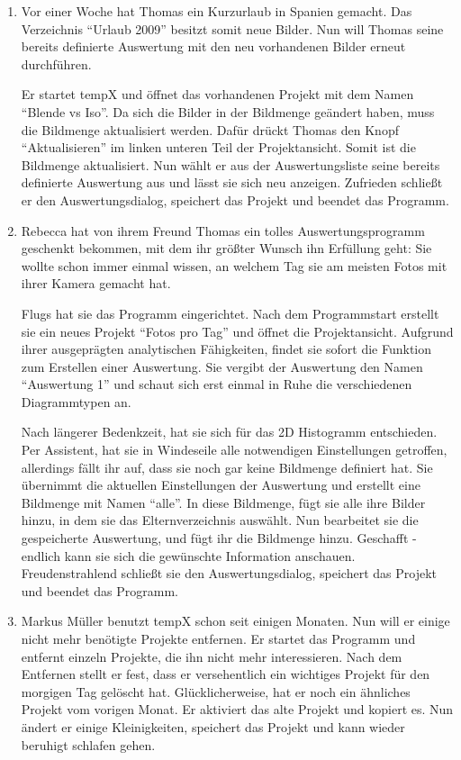 \begin{enumerate}
	\item Vor einer Woche hat Thomas ein Kurzurlaub in Spanien gemacht. Das Verzeichnis "`Urlaub 2009"' besitzt somit neue Bilder. Nun will Thomas seine bereits definierte Auswertung mit den neu vorhandenen Bilder erneut durchführen.\par
	Er startet \gls{tempX} und öffnet das vorhandenen Projekt mit dem Namen "`Blende vs Iso"'. Da sich die Bilder in der Bildmenge geändert haben, muss die Bildmenge aktualisiert werden. Dafür drückt Thomas den Knopf "`Aktualisieren"' im linken unteren Teil der Projektansicht.  Somit ist die Bildmenge aktualisiert. Nun wählt er aus der Auswertungsliste seine bereits definierte Auswertung aus und lässt sie sich neu anzeigen. Zufrieden schließt er den Auswertungsdialog, speichert das Projekt und beendet das Programm.

	\item Rebecca hat von ihrem Freund Thomas ein tolles Auswertungsprogramm geschenkt bekommen, mit dem ihr größter Wunsch ihn Erfüllung geht: Sie wollte schon immer einmal wissen, an welchem Tag sie am meisten Fotos mit ihrer Kamera gemacht hat.\par
	Flugs hat sie das Programm eingerichtet. Nach dem Programmstart erstellt sie ein neues Projekt "`Fotos pro Tag"' und öffnet die Projektansicht. Aufgrund ihrer ausgeprägten analytischen Fähigkeiten, findet sie sofort die Funktion zum Erstellen einer Auswertung. Sie vergibt der Auswertung den Namen "`Auswertung 1"' und schaut sich erst einmal in Ruhe die verschiedenen Diagrammtypen an.\par
	Nach längerer Bedenkzeit, hat sie sich für das 2D Histogramm entschieden. Per Assistent, hat sie in Windeseile alle notwendigen Einstellungen getroffen, allerdings fällt ihr auf, dass sie noch gar keine Bildmenge definiert hat. Sie übernimmt die aktuellen Einstellungen der Auswertung und erstellt eine Bildmenge mit Namen "`alle"'. In diese Bildmenge, fügt sie alle ihre Bilder hinzu, in dem sie das Elternverzeichnis auswählt. Nun bearbeitet sie die gespeicherte Auswertung, und fügt ihr die Bildmenge hinzu. Geschafft - endlich kann sie sich die gewünschte Information anschauen. Freudenstrahlend schließt sie den Auswertungsdialog, speichert das Projekt und beendet das Programm.
	
	\item Markus Müller benutzt \gls{tempX} schon seit einigen Monaten. Nun will er einige nicht mehr benötigte Projekte entfernen. Er startet das Programm und entfernt einzeln Projekte, die ihn nicht mehr interessieren. Nach dem Entfernen stellt er fest, dass er versehentlich ein wichtiges Projekt für den morgigen Tag gelöscht hat. Glücklicherweise, hat er noch ein ähnliches Projekt vom vorigen Monat. Er aktiviert das alte Projekt und kopiert es. Nun ändert er einige Kleinigkeiten, speichert das Projekt und kann wieder beruhigt schlafen gehen.
	

\end{enumerate}
